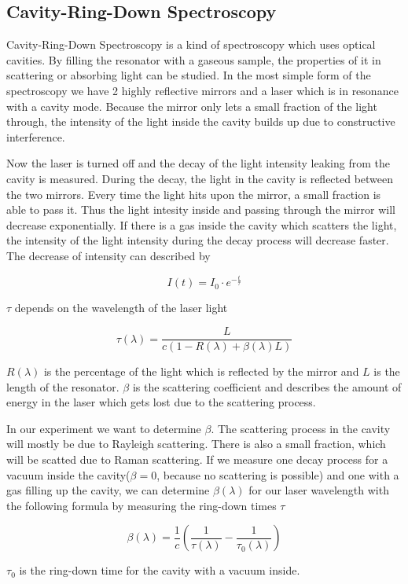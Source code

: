 \documentclass[12pt,a4paper]{article}
\begin{document}
\subsection{Cavity-Ring-Down Spectroscopy}

Cavity-Ring-Down Spectroscopy is a kind of spectroscopy which uses optical cavities. By filling the resonator with a gaseous sample, the properties of it in scattering or absorbing light can be studied. In the most simple form of the spectroscopy we have 2 highly reflective mirrors and a laser which is in resonance with a cavity mode. Because the mirror only lets a small fraction of the light through, the intensity of the light inside the cavity builds up due to constructive interference. 

Now the laser is turned off and the decay of the light intensity leaking from the cavity is measured. During the decay, the light in the cavity is reflected between the two mirrors. Every time the light hits upon the mirror, a small fraction is able to pass it. Thus the light intesity inside and passing through the mirror will decrease exponentially. If there is a gas inside the cavity which scatters the light, the intensity of the light intensity during the decay process will decrease faster. The decrease of intensity can described by

\begin{equation}
I(t) = I_0 \cdot e^{- \frac{t}{\tau}}
\end{equation}

$\tau$ depends on the wavelength of the laser light

\begin{equation}
\tau (\lambda) = \frac{L}{c (1- R(\lambda) + \beta(\lambda) L)}
\end{equation}

$R(\lambda)$ is the percentage of the light which is reflected by the mirror and $L$ is the length of the resonator. $\beta$ is the scattering coefficient and describes the amount of energy in the laser which gets lost due to the scattering process.

In our experiment we want to determine $\beta$. The scattering process in the cavity will mostly be due to Rayleigh scattering. There is also a small fraction, which will be scatted due to Raman scattering. If we measure one decay process for a vacuum inside the cavity($\beta = 0$, because no scattering is possible) and one with a gas filling up the cavity, we can determine $\beta(\lambda)$ for our laser wavelength with the following formula by measuring the ring-down times $\tau$

\begin{equation}
\beta(\lambda) = \frac{1}{c} (\frac{1}{\tau(\lambda)} - \frac{1}{\tau_0(\lambda)})
\end{equation}

$\tau_0$ is the ring-down time for the cavity with a vacuum inside.
\end{document}
